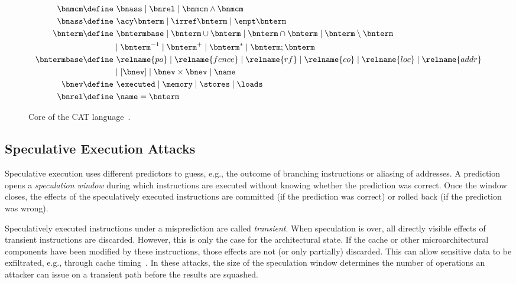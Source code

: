 \documentclass[conference]{IEEEtran}
\begin{document}
\begin{figure}[t]\small
		\begin{align*}
		\bnmcm  \define &\  \bnass\mid \bnrel \mid \bnmcm \wedge \bnmcm\\
		\bnass  \define &\ \acy \bnterm  \mid \irref \bnterm \mid \empt \bnterm  \\
		\bnterm \define&\  \bntermbase \mid \bnterm \cup \bnterm \mid \bnterm \cap \bnterm \mid \bnterm \setminus \bnterm \\
		& \mid \bnterm^{-1}  \mid \bnterm^+ \mid \bnterm^* \mid \bnterm;\bnterm  \\
		\bntermbase \define &\ \relname{po}  \mid \relname{fence} \mid \relname{rf} \mid \relname{co} \mid \relname{loc} \mid \relname{addr} \\
		& \mid [\bnev] \mid \bnev \times \bnev\mid \name  \\
		\bnev  \define &\ \executed \mid \memory \mid \stores \mid \loads\\
		\bnrel  \define &\ \name = \bnterm
		\end{align*}
		\caption{Core of the CAT language~\cite{cat}.}
		\label{fig:model}
\end{figure}

\subsection{Speculative Execution Attacks}
\label{sec:se}

Speculative execution uses different predictors to guess, e.g., the outcome of branching instructions or aliasing of addresses.
A prediction opens a \emph{speculation window} during which instructions are executed without knowing whether the prediction was correct. 
Once the window closes, the effects of the speculatively executed instructions are committed (if the prediction was correct) or rolled back (if the prediction was wrong).

Speculatively executed instructions under a misprediction are called \emph{transient}.
When speculation is over, all directly visible effects of transient instructions are discarded.
However, this is only the case for the architectural state.
If the cache or other microarchitectural components have been modified by these instructions, those effects are not (or only partially) discarded.
This can allow sensitive data to be exfiltrated, e.g., through cache timing~\cite{KocherHFGGHHLM019,LiuYGHL15}.
In these attacks, the size of the speculation window determines the number of operations an attacker can issue on a transient path before the results are squashed.
\end{document}
